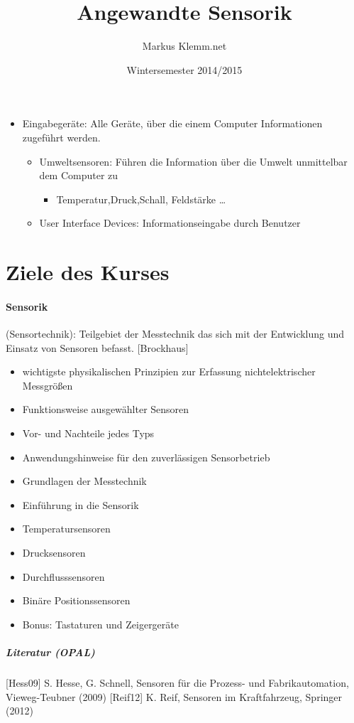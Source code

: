 \documentclass[a4paper]{scrartcl}
\title{Angewandte Sensorik}
\date{Wintersemester 2014/2015}
\author{Markus Klemm.net}
\begin{document}
\maketitle
\tableofcontents

\begin{itemize}
\item Eingabegeräte: Alle Geräte, über die einem Computer Informationen zugeführt werden.
    \begin{itemize}
    \item Umweltsensoren: Führen die Information über die Umwelt unmittelbar dem Computer zu
        \begin{itemize}
        \item Temperatur,Druck,Schall, Feldstärke \dots
        \end{itemize}
    \item User Interface Devices: Informationseingabe durch Benutzer
    \end{itemize}
\end{itemize}

\section{Ziele des Kurses}
\paragraph{Sensorik} (Sensortechnik): Teilgebiet der Messtechnik das sich mit der Entwicklung und Einsatz von Sensoren befasst. [Brockhaus]
\begin{itemize}
\item wichtigste physikalischen Prinzipien zur Erfassung nichtelektrischer Messgrößen
\item Funktionsweise ausgewählter Sensoren
\item Vor- und Nachteile jedes Typs
\item Anwendungshinweise für den zuverlässigen Sensorbetrieb
\item Grundlagen der Messtechnik
\item Einführung in die Sensorik
\item Temperatursensoren
\item Drucksensoren
\item Durchflusssensoren
\item Binäre Positionssensoren
\item Bonus: Tastaturen und Zeigergeräte
\end{itemize}
\subparagraph{Literatur (OPAL)}
[Hess09] S. Hesse, G. Schnell, Sensoren für die Prozess- und Fabrikautomation, Vieweg-Teubner (2009)
[Reif12] K. Reif, Sensoren im Kraftfahrzeug, Springer (2012)
\end{document}
